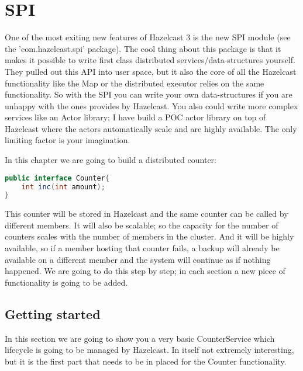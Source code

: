 \chapter{SPI}

One of the most exiting new features of Hazelcast 3 is the new SPI module (see the 'com.hazelcast.spi' package). The cool thing about this package is that it makes it possible to write first class distributed services/data-structures yourself. They pulled out this API into user space, but it also the core of all the Hazelcast functionality like the Map or the distributed executor relies on the same functionality. So with the SPI you can write your own data-structures if you are unhappy with the ones provides by Hazelcast. You also could write more complex services like an Actor library; I have build a POC actor library on top of Hazelcast where the actors automatically scale and are highly available. The only limiting factor is your imagination.

In this chapter we are going to build a distributed counter:
\begin{lstlisting}[language=java]
public interface Counter{
    int inc(int amount);
}
\end{lstlisting}
This counter will be stored in Hazelcast and the same counter can be called by different members. It will also be scalable; so the capacity for the number of counters scales with the number of members in the cluster. And it will be highly available, so if a member hosting that counter fails, a backup will already be available on a different member and the system will continue as if nothing happened. We are going to do this step by step; in each section a new piece of functionality is going to be added.

\section{Getting started}
In this section we are going to show you a very basic CounterService which lifecycle is going to be managed by Hazelcast. In itself not extremely interesting, but it is the first part that needs to be in placed for the Counter functionality.


